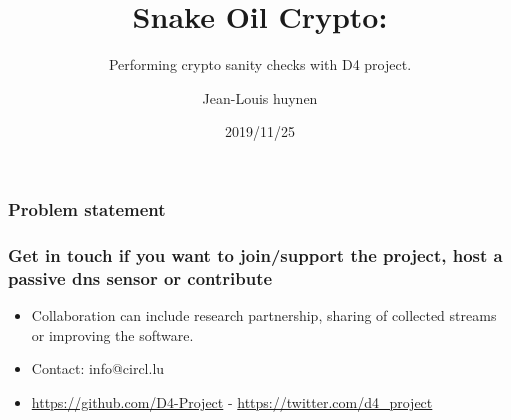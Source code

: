 \documentclass{beamer}
\title{Snake Oil Crypto:}
\subtitle{Performing crypto sanity checks with D4 project.}
\author{Jean-Louis huynen}
\institute{Team CIRCL \\ \url{https://www.d4-project.org/}}
\date{2019/11/25}
\begin{document}
    \begin{frame}
        \maketitle
    \end{frame}

\begin{frame}
        \frametitle{Problem statement}


\end{frame}

\begin{frame}
\frametitle{Get in touch if you want to join/support the project, host a passive dns sensor or contribute}
\begin{itemize}
\item Collaboration can include research partnership, sharing of collected streams or improving the software.
\item Contact: info@circl.lu
\item \url{https://github.com/D4-Project} -  \url{https://twitter.com/d4_project}
\end{itemize}
\end{frame}
\end{document}
